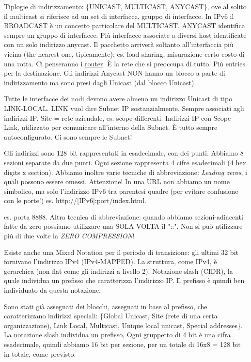 Tiplogie di indirizzamento: \{UNICAST, MULTICAST, ANYCAST\}, ove al solito il multicast si riferisce ad un set di interfacce, gruppo di interfacce. In IPv6 il BROADCAST è un concetto particolare del MULTICAST. ANYCAST identifica sempre un gruppo di interfacce. Più interfacce associate a diversi host identificate con un solo indirizzo anycast. Il pacchetto arriverà soltanto all'interfaccia più vicina (the nearest one, tipicamente); es. load-sharing, misurazione certo costo di una rotta. Ci penseranno i \underline{router}. \`E la rete che si preoccupa di tutto. Più entries per la destinazione.
Gli indirizzi Anycast NON hanno un blocco a parte di indirizzamento ma sono presi dagli Unicast (dal blocco Unicast).

Tutte le interfacce dei nodi devono avere almeno un indirizzo Unicast di tipo LINK-LOCAL. LINK vuol dire Subnet IP sostanzialmente. Sempre associati agli indirizzi IP. Site = rete aziendale, es. scope differenti. Indirizzi IP con Scope Link, utilizzato per comunicare all'interno della Subnet. \`E tutto sempre autoconfigurato. Ci sono sempre le Subnet! 

Gli indirizzi sono 128 bit rappresentati in esadecimale, con dei punti. Abbiamo 8 sezioni separate da due punti. Ogni sezione rappresenta 4 cifre esadecimali (4 hex digits x section). Abbiamo inoltre varie tecniche di abbreviazione: \textit{Leading zeros}, i quali possono essere omessi. Attenzione! In una URL non abbiamo un nome simbolico, ma solo l'indirizzo IPv6 tra parentesi quadre (per evitare confusione con le porte!) es. http://[IPv6]:port/index.html.

es. porta 8888. Altra tecnica di abbreviazione: quando abbiamo sezioni-adiacenti fatte da zero possiamo utilizzare una SOLA VOLTA il "::". Non si può utilizzare più di due volte la \textit{ZERO COMPRESSION}!

Esiste anche una Mixed Notation per il periodo di transizione: gli ultimi 32 bit fornivano l'indirizzo IPv4 (IPv4-MAPPED). La struttura, come IPv4, è gerarchica (non flat come gli indirizzi a livello 2). Notazione slash (CIDR), la quale individua un prefisso che caratterizza l'indirizzo IP. Il prefisso è quindi ben individuato da questa notazione.

Sono stati già assegnati dei blocchi, assegnati in base al prefisso, che caratterizzano indirizzi speciali: \{Global Unicast, Site (rete di una certa organizzazione), Link Local, Multicast, Unique local unicast, Special addresses\}. La notazione slash individua un prefisso, Ogni gruppetto di 4 bit è una cifra esadecimale, quindi abbiamo 16 bit per sezione, per un totale di 16x8 = 128 bit in totale, come previsto.

